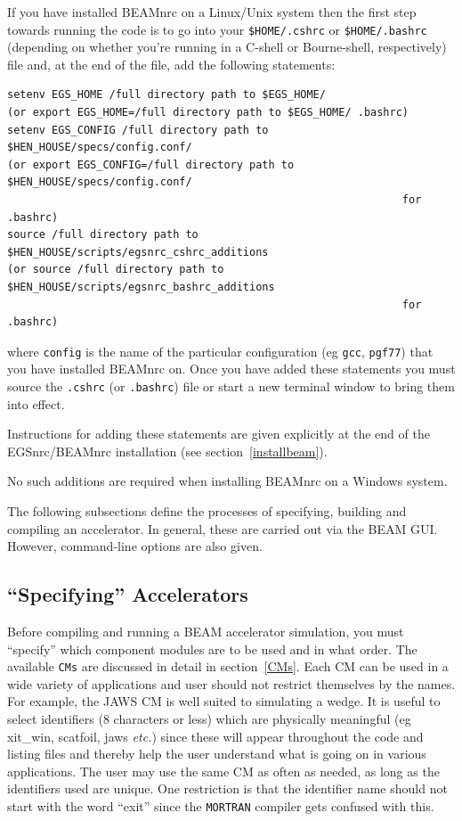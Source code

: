 \documentclass[12pt,twoside]{article}
\newcommand{\etc}{{\em etc.}}
\begin{document}
If you have installed BEAMnrc on a Linux/Unix system then the first
step towards running the code is to go into your {\tt \$HOME/.cshrc}
or {\tt \$HOME/.bashrc} (depending on whether you're running in a C-shell
or Bourne-shell, respectively) file and, at the end of the file, add the
following statements:
\begin{verbatim}
setenv EGS_HOME /full directory path to $EGS_HOME/
(or export EGS_HOME=/full directory path to $EGS_HOME/ .bashrc)
setenv EGS_CONFIG /full directory path to $HEN_HOUSE/specs/config.conf/
(or export EGS_CONFIG=/full directory path to $HEN_HOUSE/specs/config.conf/
                                                              for .bashrc)
source /full directory path to $HEN_HOUSE/scripts/egsnrc_cshrc_additions
(or source /full directory path to $HEN_HOUSE/scripts/egsnrc_bashrc_additions
                                                              for .bashrc)
\end{verbatim}
where {\tt config} is the name of the particular configuration
(eg {\tt gcc}, {\tt pgf77}) that you have installed BEAMnrc on.
Once you have added these statements you must source the {\tt .cshrc}
(or {\tt .bashrc}) file or start a new terminal window to bring them into effect.

Instructions for adding these statements are given explicitly at the
end of the EGSnrc/BEAMnrc installation (see section~\ref{installbeam}).

No such additions are required when installing BEAMnrc on a Windows system.

The following subsections define the processes of specifying, building and
compiling an accelerator.  In general, these are carried out via the BEAM GUI.
However, command-line options are also given.

\subsection{``Specifying'' Accelerators}

Before compiling and running a BEAM accelerator simulation, you must
``specify'' which component modules are to be used and in what order.
The available
\verb+CMs+ are discussed in detail in section~\ref{CMs}.  Each CM can be
used in a wide variety of applications and user should not restrict
themselves by the names. For example, the JAWS CM is well suited to
simulating a wedge.  It is useful to select identifiers (8 characters or
less) which are physically meaningful (eg xit\_win, scatfoil, jaws \etc)
since these will appear throughout the code and listing files and thereby
help the user understand
what is going on in various applications.  The user may use the same CM
as often as needed, as long as the identifiers used are unique.
One restriction is that the identifier name should not start with the
word ``exit'' since the \verb+MORTRAN+ compiler gets confused with this.
\end{document}
